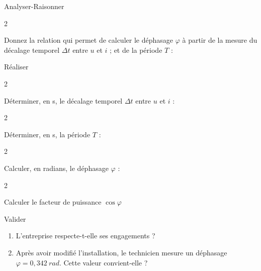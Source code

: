 \documentclass[11pt,a4paper]{article}
\newcommand{\cadreblanc}[1]{%
\medskip\framebox[\linewidth][c]{%
\rule{0mm}{#1mm}}\par
\medskip}
\begin{document}
    \vfill 


     Analyser-Raisonner 

    \begin{multicols}{2} 
      \item     Donnez la relation qui permet de calculer le déphasage $\varphi$ à partir de la mesure du décalage temporel $\Delta t$  entre $u$ et $i$ ; et de la période $T$ : 

      \cadreblanc{10}

    \end{multicols}



     Réaliser
    \begin{enumerate}
        


    \begin{multicols}{2} 
      \item Déterminer, en s, le décalage temporel $\Delta t$  entre $u$ et $i$  :

      \cadreblanc{10}

    \end{multicols}

        \begin{multicols}{2} 
      \item Déterminer, en s, la période $T$ :

      \cadreblanc{10}

    \end{multicols}

        \begin{multicols}{2} 
      \item Calculer, en radians, le déphasage $\varphi$ :

      \cadreblanc{10}

    \end{multicols}

        \begin{multicols}{2} 
      \item Calculer le facteur de puissance $\cos \varphi$

      \cadreblanc{10}

    \end{multicols}
        \end{enumerate}


     Valider

    \begin{enumerate}
        \item L'entreprise respecte-t-elle ses engagements ?  \\

    \vspace{3mm} \dotfill 

    \item Après avoir modifié l'installation, le technicien mesure un déphasage $\varphi=0,342 ~rad$. Cette valeur convient-elle ? \\

    \cadreblanc{15}

    \end{enumerate}
    
\end{document}
